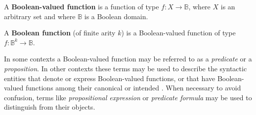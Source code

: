 \documentclass[12pt]{article}
\begin{document}

A \textbf{Boolean-valued function} is a function of type $f : X \to \mathbb{B}$, where $X$ is an arbitrary set and where $\mathbb{B}$ is a Boolean domain.

A \textbf{Boolean function} (of finite arity $k$) is a Boolean-valued function of type $f : \mathbb{B}^k \to \mathbb{B}$.

In some contexts a Boolean-valued function may be referred to as a \textit{predicate} or a \textit{proposition}.  In other contexts these terms may be used to describe the syntactic entities that denote or express Boolean-valued functions, or that have Boolean-valued functions among their canonical or intended .  When necessary to avoid confusion, terms like \textit{propositional expression} or \textit{predicate formula} may be used to distinguish  from their objects.

\end{document}
